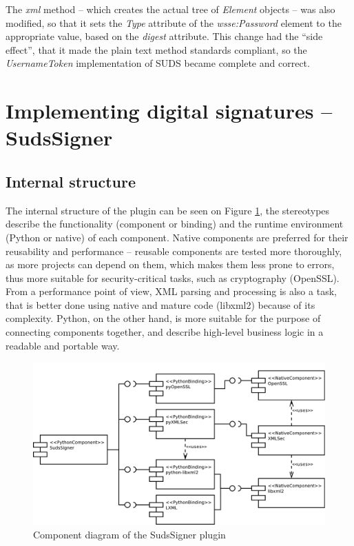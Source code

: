 The \emph{xml} method -- which creates the actual tree of \emph{Element} objects -- was also modified, so that it sets the \emph{Type} attribute of the \emph{wsse:Password} element to the appropriate value, based on the \emph{digest} attribute. This change had the ``side effect'', that it made the plain text method standards compliant, so the \emph{UsernameToken} implementation of SUDS became complete and correct.

\section{Implementing digital signatures -- SudsSigner}

\subsection{Internal structure}

The internal structure of the plugin can be seen on Figure \ref{fig:cmpdSudsSigner}, the stereotypes describe the functionality (component or binding) and the runtime environment (Python or native) of each component. Native components are preferred for their reusability and performance -- reusable components are tested more thoroughly, as more projects can depend on them, which makes them less prone to errors, thus more suitable for security-critical tasks, such as cryptography (OpenSSL). From a performance point of view, XML parsing and processing is also a task, that is better done using native and mature code (libxml2) because of its complexity. Python, on the other hand, is more suitable for the purpose of connecting components together, and describe high-level business logic in a readable and portable way.

\begin{figure}[htbp]
 \centering
 \includegraphics[width=\textwidth]{images/cmpdSudsSigner.pdf}
 \caption{Component diagram of the SudsSigner plugin}
 \label{fig:cmpdSudsSigner}
\end{figure}

